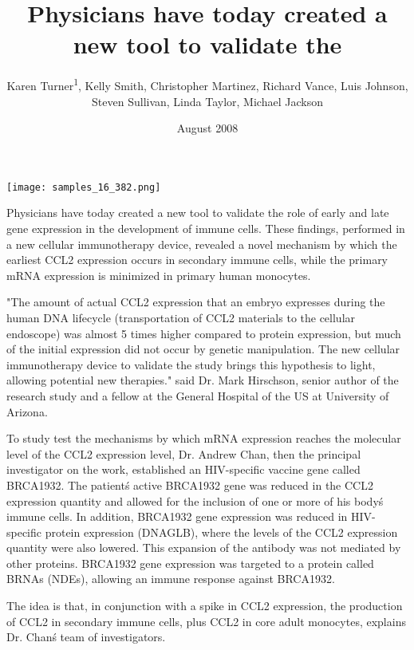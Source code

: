 \documentclass{article}
\title{Physicians have today created a new tool to validate the}
\author{Karen Turner\textsuperscript{1},  Kelly Smith,  Christopher Martinez,  Richard Vance,  Luis Johnson,  Steven Sullivan,  Linda Taylor,  Michael Jackson}
\affil{\textsuperscript{1}Tsinghua University}
\date{August 2008}
\begin{document}
\maketitle

\begin{center}
\begin{minipage}{0.75\linewidth}
\texttt{[image: samples\_16\_382.png]}
\end{minipage}
\end{center}

Physicians have today created a new tool to validate the role of early and late gene expression in the development of immune cells. These findings, performed in a new cellular immunotherapy device, revealed a novel mechanism by which the earliest CCL2 expression occurs in secondary immune cells, while the primary mRNA expression is minimized in primary human monocytes.

"The amount of actual CCL2 expression that an embryo expresses during the human DNA lifecycle (transportation of CCL2 materials to the cellular endoscope) was almost 5 times higher compared to protein expression, but much of the initial expression did not occur by genetic manipulation. The new cellular immunotherapy device to validate the study brings this hypothesis to light, allowing potential new therapies." said Dr. Mark Hirschson, senior author of the research study and a fellow at the General Hospital of the US at University of Arizona.

To study test the mechanisms by which mRNA expression reaches the molecular level of the CCL2 expression level, Dr. Andrew Chan, then the principal investigator on the work, established an HIV-specific vaccine gene called BRCA1932. The patient\'s active BRCA1932 gene was reduced in the CCL2 expression quantity and allowed for the inclusion of one or more of his body\'s immune cells. In addition, BRCA1932 gene expression was reduced in HIV-specific protein expression (DNAGLB), where the levels of the CCL2 expression quantity were also lowered. This expansion of the antibody was not mediated by other proteins. BRCA1932 gene expression was targeted to a protein called BRNAs (NDEs), allowing an immune response against BRCA1932.

The idea is that, in conjunction with a spike in CCL2 expression, the production of CCL2 in secondary immune cells, plus CCL2 in core adult monocytes, explains Dr. Chan\'s team of investigators.
\end{document}
